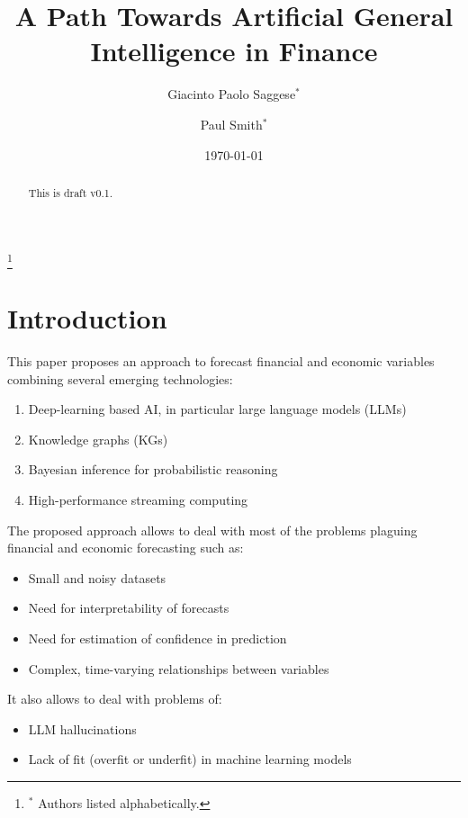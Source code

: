 \documentclass[11pt, reqno]{amsart}
\theoremstyle{definition}
\theoremstyle{remark}
\begin{document}
	\title{A Path Towards Artificial General Intelligence in Finance}

	\author{Giacinto Paolo Saggese$^{*}$}
	\author{Paul Smith$^{*}$}
	\thanks{$^{*}$ Authors listed alphabetically.}

	\date{\today}

	\begin{abstract}
		This is draft v0.1.
	\end{abstract}

	\maketitle

	\setcounter{tocdepth}{2}
	\tableofcontents

	\section{Introduction}

    This paper proposes an approach to forecast financial and economic
    variables combining several emerging technologies:
		\begin{enumerate}
			\item Deep-learning based AI, in particular large language models (LLMs)

			\item Knowledge graphs (KGs)

			\item Bayesian inference for probabilistic reasoning

			\item High-performance streaming computing
		\end{enumerate}

    The proposed approach allows to deal with most of the problems plaguing
    financial and economic forecasting such as:
    \begin{itemize}
      \item Small and noisy datasets
      \item Need for interpretability of forecasts
      \item Need for estimation of confidence in prediction
      \item Complex, time-varying relationships between variables
    \end{itemize}

    It also allows to deal with problems of:
    \begin{itemize}
      \item LLM hallucinations
      \item Lack of fit (overfit or underfit) in machine learning models
    \end{itemize}
\end{document}
